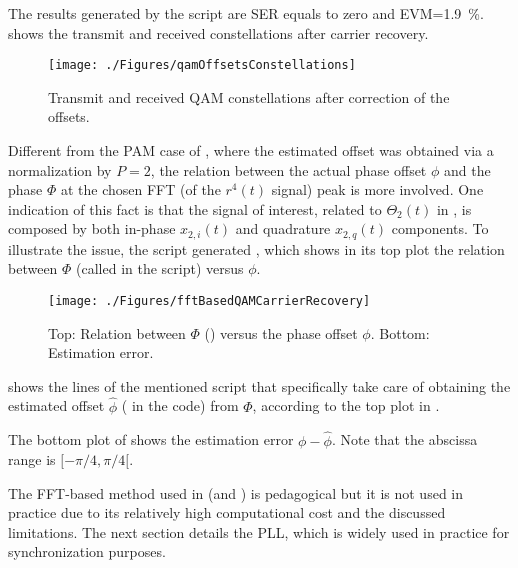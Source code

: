 The results generated by the script  
are SER equals to zero and EVM=1.9~\%.
 shows the transmit and received 
constellations after carrier recovery.

\begin{figure}[htbp]
\centering
\texttt{[image: ./Figures/qamOffsetsConstellations]}
\caption{Transmit and received 
QAM constellations after correction of the offsets.\label{fig:qamOffsetsConstellations}}
\end{figure}

Different from the PAM case of , where the estimated
offset was obtained via a normalization by $P=2$,
the relation between the actual phase offset $\phi$ and the phase $\Phi$ at the chosen
FFT (of the $r^4(t)$ signal) peak is more involved.
One indication of this fact is that 
the 
signal of interest, related to $\Theta_2(t)$ in , is composed by
both in-phase $x_{2,i}(t)$ and quadrature $x_{2,q}(t)$ components. To illustrate
the issue, the script 
generated , which shows in its top plot
the relation between $\Phi$ (called  in the script) versus $\phi$.

\begin{figure}[htbp]
\centering
\texttt{[image: ./Figures/fftBasedQAMCarrierRecovery]}
\caption{Top: Relation between $\Phi$ () versus the phase offset $\phi$. Bottom: Estimation error.\label{fig:fftBasedQAMCarrierRecovery}}
\end{figure}

 shows the lines of the mentioned script that specifically
take care of obtaining the estimated offset $\hat \phi$ ( in the code) from
$\Phi$, according to the top plot in .



The bottom plot of  shows the estimation error $\phi - \hat \phi$.
Note that the abscissa range is $[-\pi/4, \pi/4[$.
\eExample

The FFT-based method used in  (and ) is pedagogical but it is not used in practice due to its relatively high computational cost and the discussed limitations. The next section details the PLL, which is widely used in practice for synchronization purposes.

